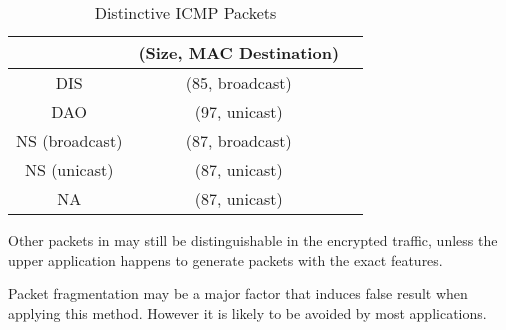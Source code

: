 \begin{table}[ht!]
	\center
	{
		\begin{tabular}{|c|c|c|}
			\hline
			 & (Size, MAC Destination)\\ \hline
			DIS   & (85, broadcast)                       \\ \hline
			DAO   & (97, unicast)                       \\ \hline
			NS (broadcast)   & (87, broadcast)                       \\ \hline	
			NS (unicast)   & (87, unicast)                       \\ \hline
			NA 	& (87, unicast)                       \\ \hline
		\end{tabular}
	}
	\caption{Distinctive ICMP Packets}
	\label{TAICMP}
\end{table}

Other packets in  may still be distinguishable in the encrypted traffic, unless the upper application happens to generate packets with the exact features. 

Packet fragmentation may be a major factor that induces false result when applying this method. However it is likely to be avoided by most applications.

